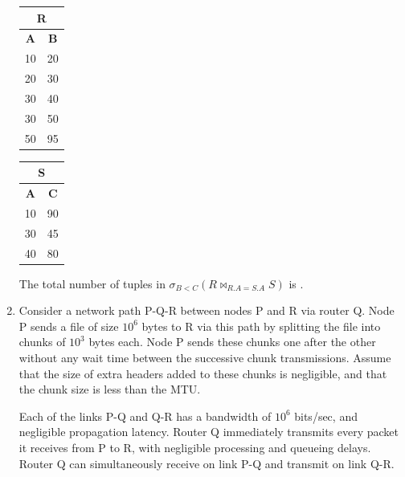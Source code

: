 \documentclass[a4paper, 11pt]{article}
\begin{document}
\begin{enumerate}
    \begin{minipage}{0.45\textwidth}
        \centering
        \begin{tabular}{|c|c|}
            \hline
            \multicolumn{2}{|c|}{\textbf{R}} \\
            \hline
            \textbf{A} & \textbf{B} \\
            \hline
            10 & 20 \\
            \hline
            20 & 30 \\
            \hline
            30 & 40 \\
            \hline
            30 & 50 \\
            \hline
            50 & 95 \\
            \hline
        \end{tabular}
    \end{minipage}
    \begin{minipage}{0.45\textwidth}
        \centering
        \begin{tabular}{|c|c|}
            \hline
            \multicolumn{2}{|c|}{\textbf{S}} \\
            \hline
            \textbf{A} & \textbf{C} \\
            \hline
            10 & 90 \\
            \hline
            30 & 45 \\
            \hline
            40 & 80 \\
            \hline
        \end{tabular}
    \end{minipage}
    
    The total number of tuples in $\sigma_{B<C}(R \bowtie_{R.A=S.A} S)$ is \underline{\hspace{2cm}}.

    \hfill{}

    \item Consider a network path P-Q-R between nodes P and R via router Q. Node P sends a file of size $10^6$ bytes to R via this path by splitting the file into chunks of $10^3$ bytes each. Node P sends these chunks one after the other without any wait time between the successive chunk transmissions. Assume that the size of extra headers added to these chunks is negligible, and that the chunk size is less than the MTU.
    
    Each of the links P-Q and Q-R has a bandwidth of $10^6$ bits/sec, and negligible propagation latency. Router Q immediately transmits every packet it receives from P to R, with negligible processing and queueing delays. Router Q can simultaneously receive on link P-Q and transmit on link Q-R.
    

\end{enumerate}
\end{document}

